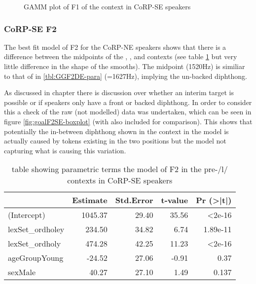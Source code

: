 \documentclass[../../../00.FullDoc/tex/Thesis]{subfiles}
\begin{document}
\begin{center}
	\begin{figure}[h]
		
		\caption{GAMM plot of F1 of the \goal{} context in CoRP-SE speakers} \label{fig:goalF1SE}
	\end{figure}
\end{center}


\subsubsection{CoRP-SE F2} \label{subsubsec:morphSEF2}
The best fit model of F2 for the CoRP-NE speakers shows that there is a difference between the midpoints of the \hole{}, \holey{}, and \holy{} contexts (see table \ref{tbl:goalF2SE-para} but very little difference in the shape of the smooths). The \holy{} midpoint (1520Hz) is similiar to that of \hope{} in \ref{tbl:GGF2DE-para} (=1627Hz), implying the un-backed diphthong.

As discussed in chapter \notinsubfile{\ref{ch:LitReview})} there is discussion over whether an interim target is possible or if speakers only have a front or backed diphthong. In order to consider this a check of the raw (not modelled) data was undertaken, which can be seen in figure \ref{fig:goalF2SE-boxplot} (with \hope{} also included for comparison). This shows that potentially the in-between diphthong shown in the \holey{} context in the model is actually caused by tokens existing in the two positions but the model not capturing what is causing this variation. 

\begin{table}[htbp]
	\centering
	\begin{tabular}{lrrrr}
		\hline
		& Estimate & Std.Error & t-value & Pr (>|t|) \\
		\hline   
		(Intercept) & 1045.37 & 29.40 & 35.56 & <2e-16 \\
		lexSet\_ordholey & 234.50 & 34.82 & 6.74 & 1.89e-11 \\
		lexSet\_ordholy & 474.28 & 42.25 & 11.23 & <2e-16 \\
		ageGroupYoung & -24.52 & 27.06 & -0.91 & 0.37 \\
		sexMale & 40.27 & 27.10 & 1.49 & 0.137 \\
		\hline
	\end{tabular}%
	\caption{table showing parametric terms the model of F2 in the pre-/l/ contexts in CoRP-SE speakers}
	\label{tbl:goalF2SE-para}%
\end{table}%
\end{document}
